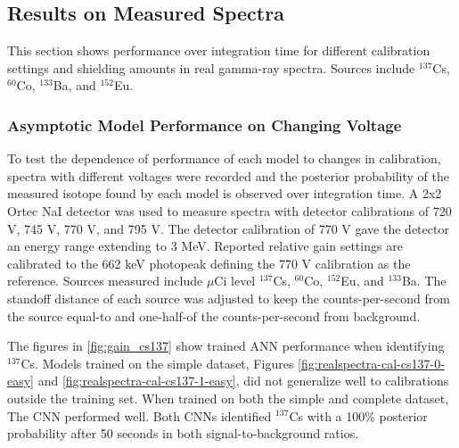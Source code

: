 


\subsection{Results on Measured Spectra}

This section shows performance over integration time for different calibration settings and shielding amounts in real gamma-ray spectra. Sources include $^{137}$Cs, $^{60}$Co, $^{133}$Ba, and $^{152}$Eu. 



\subsubsection{Asymptotic Model Performance on Changing Voltage}

To test the dependence of performance of each model to changes in calibration, spectra with different voltages were recorded and the posterior probability of the measured isotope found by each model is observed over integration time. A 2x2 Ortec NaI detector was used to measure spectra with detector calibrations of 720 V, 745 V, 770 V, and 795 V. The detector calibration of 770 V gave the detector an energy range extending to 3 MeV. Reported relative gain settings are calibrated to the 662 keV photopeak defining the 770 V calibration as the reference. Sources measured include $\mu$Ci level $^{137}$Cs, $^{60}$Co, $^{152}$Eu, and $^{133}$Ba. The standoff distance of each source was adjusted to keep the counts-per-second from the source equal-to and one-half-of the counts-per-second from background.

The figures in \ref{fig:gain_cs137} show trained ANN performance when identifying $^{137}$Cs. Models trained on the simple dataset, Figures \ref{fig:realspectra-cal-cs137-0-easy} and \ref{fig:realspectra-cal-cs137-1-easy}, did not generalize well to calibrations outside the training set. When trained on both the simple and complete dataset, The CNN performed well. Both CNNs identified $^{137}$Cs with a 100\% posterior probability after 50 seconds in both signal-to-background ratios.%


